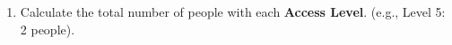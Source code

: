 \documentclass[12pt,a4paper]{article}
\begin{document}
\begin{enumerate}


    \item Calculate the total number of people with each \textbf{Access Level}. (e.g., Level 5: 2 people).







\end{enumerate}
\end{document}
